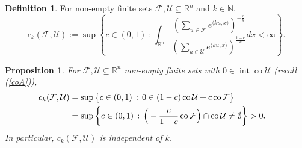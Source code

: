 \documentclass{article}
\newcommand\cF{{\mathcal F}}
\newcommand\cU{{\mathcal U}}
\newcommand{\NN}{{\mathbb N}}
\newcommand{\RR}{{\mathbb R}}
\renewcommand{\>}{\rightarrow}
\DeclareMathOperator{\Int}{int}
\DeclareMathOperator{\co}{co}
\theoremstyle{plain}
\newtheorem{prop}[theorem]{Proposition}
\theoremstyle{definition}
\newtheorem{definition}[theorem]{Definition}
\newcommand{\bdefn}{\begin{definition}}
\newcommand{\edefn}{\end{definition}}
\begin{document}
\bdefn
    For non-empty finite sets $\cF,\cU\subseteq\RR^n$ and $k\in\NN$,
    $$
        c_k({\cF,\cU}):=\sup\left\{c\in(0,1)\,:\,\int_{\RR^n}\frac{\left(\sum_{u\in \cF}e^{\langle ku,x\rangle}\right)^{-\frac{c}{k}}}{\left(\sum_{u\in \cU}e^{\langle ku,x\rangle}\right)^\frac{1-c}{k}}dx<\infty\right\}.
    $$
\edefn
 
\begin{prop}
\label{generalizeSong}
     For $\cF,\cU\subseteq\RR^n$  non-empty finite sets
    with $0\in\Int \co\cU$ (recall (\ref{coA})), 
\begin{align*}
    c_k({\cF,\cU})
    &=\sup\big\{c\in(0,1)\,:\,0\in (1-c)\co\cU+{c}\co\cF\big\}\cr
    &=\sup\left\{c\in(0,1)\,:\,\Big(-\frac{c}{1-c}\co\cF\Big)\cap 
        \co\cU\neq\emptyset\right\}>0.
\end{align*}
    In particular, $c_k({\cF,\cU})$ is independent of $k$.
\end{prop}
\end{document}
